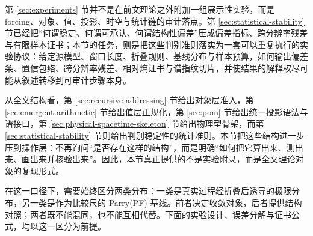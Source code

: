第 \ref{sec:experiments} 节并不是在前文理论之外附加一组展示性实验，而是 forcing、对象、值、投影、时空与统计链的审计落点。第 \ref{sec:statistical-stability} 节已经把“何谓稳定、何谓可承认、何谓结构性偏差”压成偏差指标、跨分辨率残差与有限样本证书；本节的任务，则是把这些判别准则落实为一套可以重复执行的实验协议：给定源模型、窗口长度、折叠规则、基线分布与样本预算，如何输出偏差条、置信包络、跨分辨率残差、相对熵证书与谱指纹切片，并使结果的解释权尽可能从叙述转移到可审计步骤本身。

从全文结构看，第 \ref{sec:recursive-addressing} 节给出对象层准入，第 \ref{sec:emergent-arithmetic} 节给出值层正规化，第 \ref{sec:pom} 节给出统一投影语法与谱接口，第 \ref{sec:physical-spacetime-skeleton} 节给出物理型骨架，而第 \ref{sec:statistical-stability} 节则给出判别稳定性的统计准则。本节把这些结构进一步压到操作层：不再询问“是否存在这样的结构”，而是明确“如何把它算出来、测出来、画出来并核验出来”。因此，本节真正提供的不是实验附录，而是全文理论对象的复现形式。

在这一口径下，需要始终区分两类分布：一类是真实过程经折叠后诱导的极限分布，另一类是作为比较尺的 Parry(PF) 基线。前者决定收敛对象，后者提供结构对照；两者既不能混同，也不能互相代替。下面的实验设计、误差分解与证书公式，均以这一区分为前提。
